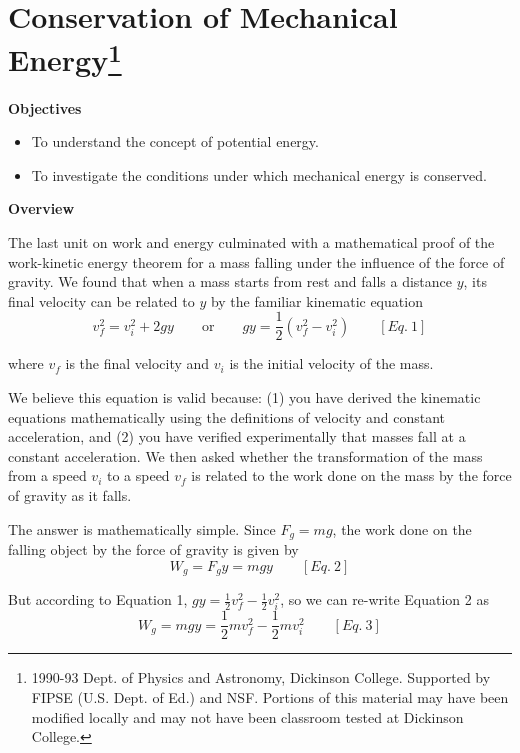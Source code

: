 
\section{Conservation of Mechanical Energy\footnote{
1990-93 Dept. of Physics and Astronomy, Dickinson College. Supported by FIPSE
(U.S. Dept. of Ed.) and NSF. Portions of this material may have been modified
locally and may not have been classroom tested at Dickinson College.
}}

\makelabheader %

\textbf{Objectives }

\begin{itemize}
\item To understand the concept of potential energy. 
\item To investigate the conditions under which mechanical energy is conserved.
\end{itemize}
\textbf{Overview }

The last unit on work and energy culminated with a mathematical proof of the
work-kinetic energy theorem for a mass falling under the influence of the 
force of gravity. We found that when a mass starts from rest and falls a 
distance $y$, its final velocity can be related to $y$ by the familiar 
kinematic equation
\[
v_{f}^{2}=v_{i}^{2}+2gy\qquad \mbox{or}
\qquad gy=\frac{1}{2}\left( v_{f}^{2}-v_{i}^{2}\right) \qquad [Eq.\: 1]\]


where \( v_{f} \) is the final velocity and \( v_{i} \) is the initial velocity
of the mass.

We believe this equation is valid because: (1) you have derived the kinematic
equations mathematically using the definitions of velocity and constant 
acceleration, and (2) you have verified experimentally that masses fall at a 
constant acceleration.
We then asked whether the transformation of the mass from a speed \( v_{i} \)
to a speed \( v_{f} \) is related to the work done on the mass by the force
of gravity as it falls.

The answer is mathematically simple. Since \( F_{g}=mg \), the work done
on the falling object by the force of gravity is given by
\[
W_{g}=F_{g}y=mgy\qquad [Eq.\: 2]\]


But according to Equation 1, \(gy = \frac{1}{2} v_{f}^{2} - \frac{1}{2} 
v_{i}^{2} \),
so we can re-write Equation 2 as
\[
W_{g}=mgy=\frac{1}{2}mv_{f}^{2}-\frac{1}{2}mv_{i}^{2}\qquad [Eq.\: 3]\]


